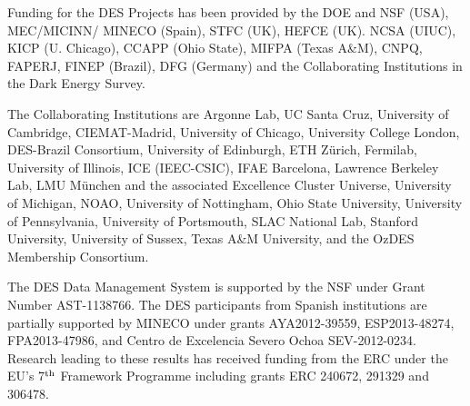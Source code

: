 Funding for the DES Projects has been provided by the DOE and NSF (USA),
MEC/MICINN/ MINECO (Spain), STFC (UK), HEFCE (UK). NCSA (UIUC),
KICP (U. Chicago), CCAPP (Ohio State), MIFPA (Texas A\&M), CNPQ, FAPERJ,
FINEP (Brazil), DFG (Germany) and the Collaborating Institutions in the Dark Energy Survey.

The Collaborating Institutions are Argonne Lab, UC Santa Cruz,
University of Cambridge, CIEMAT-Madrid, University of Chicago, University College London,
DES-Brazil Consortium, University of Edinburgh, ETH Z{\"u}rich, Fermilab,
University of Illinois, ICE (IEEC-CSIC), IFAE Barcelona, Lawrence Berkeley Lab,
LMU M{\"u}nchen and the associated Excellence Cluster Universe,
University of Michigan, NOAO, University of Nottingham, Ohio State University, University of
Pennsylvania, University of Portsmouth, SLAC National Lab, Stanford University,
University of Sussex, Texas A\&M University, and the OzDES Membership Consortium.

The DES Data Management System is supported by the NSF under
Grant Number AST-1138766. The DES participants from Spanish institutions are partially
supported by MINECO under grants AYA2012-39559, ESP2013-48274, FPA2013-47986,
and Centro de Excelencia Severo Ochoa SEV-2012-0234. Research leading
to these results has received funding from the ERC under the EU's 7$^{\rm th}$
Framework Programme including grants ERC 240672, 291329 and 306478.
